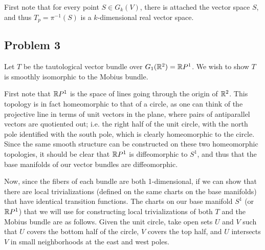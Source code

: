 \documentclass{../../mathnotes}
\begin{document}
First note that for every point $S\in G_k(V)$, there is attached the vector space $S$, and thus $T_p=\pi^{-1}(S)$ is
a $k$-dimensional real vector space.

\subsection*{Problem 3}

Let $T$ be the tautological vector bundle over $G_1(\mathbb{R}^2)=\mathbb{R} P^1$. We wish to show $T$ is smoothly isomorphic
to the Mobius bundle.

First note that $\mathbb{R} P^1$ is the space of lines going through the origin of $\mathbb{R}^2$. This topology
is in fact homeomorphic to that of a circle, as one can think of the projective line in terms of unit vectors in the plane, where
pairs of antiparallel vectors are quotiented out; i.e. the right half of the unit circle, with the north pole identified with the south
pole, which is clearly homeomorphic to the circle. Since the same smooth structure can be constructed on these two homeomorphic topologies,
it should be clear that $\mathbb{R} P^1$ is diffeomorphic to $S^1$, and thus that the base manifolds of our vector bundles are diffeomorphic.

Now, since the fibers of each bundle are both 1-dimensional, if we can show that there are local trivializations
(defined on the same charts on the base manifolds) that have identical transition functions. The charts on our base manifold $S^1$
(or $\mathbb{R} P^1$) that we will use for constructing local trivializations of both $T$ and the Mobius bundle are as follows. Given
the unit circle, take open sets $U$ and $V$ such that $U$ covers the bottom half of the circle, $V$ covers the top half, and $U$
intersects $V$ in small neighborhoods at the east and west poles.

\end{document}
